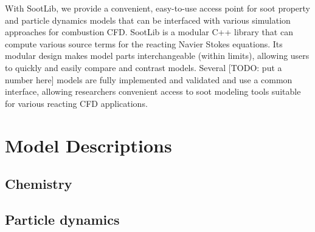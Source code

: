 \documentclass[preprint,12pt, a4paper]{elsarticle}
\begin{document}
With SootLib, we provide a convenient, easy-to-use access point for soot property and particle dynamics models that can be interfaced with various simulation approaches for combustion CFD. SootLib is a modular C++ library that can compute various source terms for the reacting Navier Stokes equations. Its modular design makes model parts interchangeable (within limits), allowing users to quickly and easily compare and contrast models. Several [TODO: put a number here] models are fully implemented and validated and use a common interface, allowing researchers convenient access to soot modeling tools suitable for various reacting CFD applications.


\section{Model Descriptions}
\label{s:models}

\subsection{Chemistry}
\label{ss:chemistry}

\subsection{Particle dynamics}
\label{ss:particle_dynamics}
\end{document}
